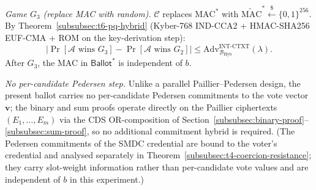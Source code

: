 \emph{Game $G_3$ (replace MAC with random).} $\mathcal{C}$ replaces $\text{MAC}^*$ with $\widetilde{\text{MAC}}^* \stackrel{\$}{\leftarrow} \{0,1\}^{256}$. By Theorem~\ref{subsubsec:t6-pq-hybrid} (Kyber-768 IND-CCA2 + HMAC-SHA256 EUF-CMA + ROM on the key-derivation step):
\begin{equation*}
    |\Pr[\mathcal{A} \text{ wins } G_3] - \Pr[\mathcal{A} \text{ wins } G_2]| \leq \mathrm{Adv}^{\mathrm{INT\text{-}CTXT}}_{\mathcal{B}_{\text{Hyb}}}(\lambda).
\end{equation*}
After $G_3$, the MAC in $\mathsf{Ballot}^*$ is independent of $b$.

\emph{No per-candidate Pedersen step.} Unlike a parallel Paillier--Pedersen design, the present ballot carries no per-candidate Pedersen commitments to the vote vector $\mathbf{v}$; the binary and sum proofs operate directly on the Paillier ciphertexts $(E_1, \ldots, E_m)$ via the CDS OR-composition of Section~\ref{subsubsec:binary-proof}--\ref{subsubsec:sum-proof}, so no additional commitment hybrid is required. (The Pedersen commitments of the SMDC credential are bound to the voter's credential and analysed separately in Theorem~\ref{subsubsec:t4-coercion-resistance}; they carry slot-weight information rather than per-candidate vote values and are independent of $b$ in this experiment.)


